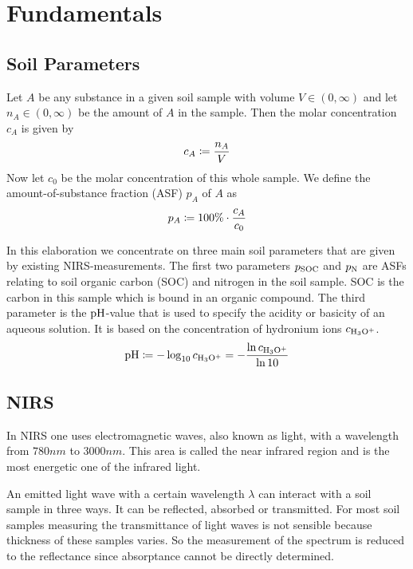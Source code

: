 \section{Fundamentals}
\label{sec:fundamentals}
	
	\subsection{Soil Parameters}
	\label{ssec:soil-parameters}
	
		Let $A$ be any substance in a given soil sample with volume $V\in(0,\infty)$ and let $n_A\in(0,\infty)$ be the amount of $A$ in the sample.
		Then the molar concentration $c_A$ is given by
		\[
			c_A \coloneqq \frac{n_A}{V}
		\]
		Now let $c_0$ be the molar concentration of this whole sample.
		We define the amount-of-substance fraction (ASF) $p_A$ of $A$ as 
		\[
			p_A \coloneqq 100\%\cdot\frac{c_A}{c_0}
		\]

		In this elaboration we concentrate on three main soil parameters that are given by existing NIRS-measurements.
		The first two parameters $p_{\mathrm{SOC}}$ and $p_{\mathrm{N}}$ are ASFs relating to soil organic carbon (SOC) and nitrogen in the soil sample.
		SOC is the carbon in this sample which is bound in an organic compound.
		The third parameter is the $\mathrm{pH}$-value that is used to specify the acidity or basicity of an aqueous solution.
		It is based on the concentration of hydronium ions $c_{\mathrm{H_3O^+}}$.
		\[
			\mathrm{pH} \coloneqq -\log_{10} c_{\mathrm{H_3O^+}} = -\frac{\ln c_{\mathrm{H_3O^+}}}{\ln 10}
		\]
	

	\subsection{NIRS}
	\label{ssec:nirs}
	
		In NIRS one uses electromagnetic waves, also known as light, with a wavelength from $780\unit{nm}$ to $3000\unit{nm}$.
		This area is called the near infrared region and is the most energetic one of the infrared light.

		An emitted light wave with a certain wavelength $\lambda$ can interact with a soil sample in three ways.
		It can be reflected, absorbed or transmitted.
		For most soil samples measuring the transmittance of light waves is not sensible because thickness of these samples varies.
		So the measurement of the spectrum is reduced to the reflectance since absorptance cannot be directly determined.

